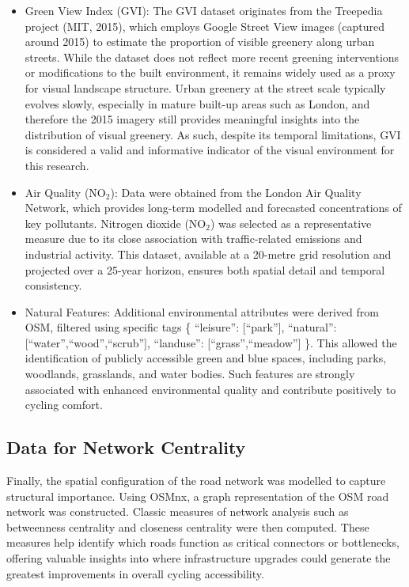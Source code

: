 \documentclass[
  12pt,
  oneside]{book}
\begin{document}
\begin{itemize}
\item
  Green View Index (GVI): The GVI dataset originates from the Treepedia project (MIT, 2015), which employs Google Street View images (captured around 2015) to estimate the proportion of visible greenery along urban streets. While the dataset does not reflect more recent greening interventions or modifications to the built environment, it remains widely used as a proxy for visual landscape structure. Urban greenery at the street scale typically evolves slowly, especially in mature built-up areas such as London, and therefore the 2015 imagery still provides meaningful insights into the distribution of visual greenery. As such, despite its temporal limitations, GVI is considered a valid and informative indicator of the visual environment for this research.
\item
  Air Quality (NO\(_2\)): Data were obtained from the London Air Quality Network, which provides long-term modelled and forecasted concentrations of key pollutants. Nitrogen dioxide (NO\(_2\)) was selected as a representative measure due to its close association with traffic-related emissions and industrial activity. This dataset, available at a 20-metre grid resolution and projected over a 25-year horizon, ensures both spatial detail and temporal consistency.
\item
  Natural Features: Additional environmental attributes were derived from OSM, filtered using specific tags \{ ``leisure'': {[}``park''{]}, ``natural'': {[}``water'',``wood'',``scrub''{]}, ``landuse'': {[}``grass'',``meadow''{]} \}. This allowed the identification of publicly accessible green and blue spaces, including parks, woodlands, grasslands, and water bodies. Such features are strongly associated with enhanced environmental quality and contribute positively to cycling comfort.
\end{itemize}

\subsection{Data for Network Centrality}\label{data-for-network-centrality}

Finally, the spatial configuration of the road network was modelled to capture structural importance. Using OSMnx, a graph representation of the OSM road network was constructed. Classic measures of network analysis such as betweenness centrality and closeness centrality were then computed. These measures help identify which roads function as critical connectors or bottlenecks, offering valuable insights into where infrastructure upgrades could generate the greatest improvements in overall cycling accessibility.
\end{document}
